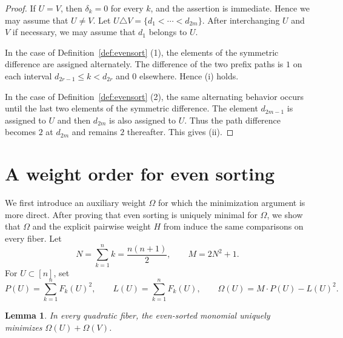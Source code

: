 \documentclass[11pt]{amsart}
\newtheorem{lemma}[theorem]{Lemma}
\theoremstyle{definition}
\numberwithin{equation}{section}
\begin{document}
\begin{proof}
If $U=V$, then $\delta_k=0$ for every $k$, and the assertion is immediate. Hence we may assume that $U\ne V$. 
Let $U\triangle V=\{d_1<\cdots<d_{2m}\}$.
After interchanging $U$ and $V$ if necessary, we may assume that $d_1$ belongs to $U$.

In the case of Definition~\ref{def:evensort} (1), the elements of the symmetric difference are assigned alternately. The difference of the two prefix paths is $1$ on each interval $d_{2r-1}\le k<d_{2r}$ and $0$ elsewhere. Hence (i) holds.

In the case of Definition~\ref{def:evensort} (2), the same alternating behavior occurs until the last two elements of the symmetric difference. The element $d_{2m-1}$ is assigned to $U$ and then $d_{2m}$ is also assigned to $U$. Thus the path difference becomes $2$ at $d_{2m}$ and remains $2$ thereafter. This gives (ii).
\end{proof}

\section{A weight order for even sorting}

We first introduce an auxiliary weight $\Omega$ for which the minimization argument is more direct.
After proving that even sorting is uniquely minimal for $\Omega$, we show that $\Omega$ and the explicit pairwise weight $H$ from  induce the same comparisons on every fiber. 
Let
\[
N=\sum_{k=1}^n k=\frac{n(n+1)}2,
 \qquad
M=2N^2+1.
\]
For $U\subset[n]$, set
\[
P(U)=\sum_{k=1}^n F_k(U)^2,
 \qquad
L(U)=\sum_{k=1}^nF_k(U),
 \qquad
 \Omega(U)=M \cdot P(U)-L(U)^2.
\]

\begin{lemma}\label{lem:quadraticminimum}
In every quadratic fiber, the even-sorted monomial uniquely minimizes $\Omega(U)+\Omega(V)$.
\end{lemma}
\end{document}

